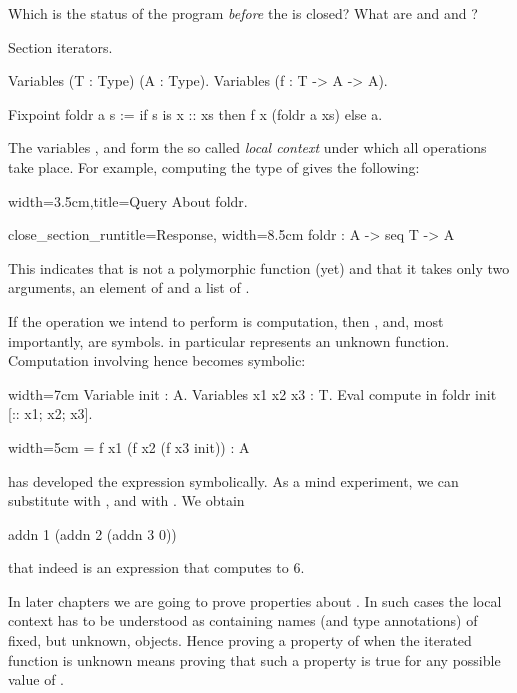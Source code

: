 Which is the status of the  program \emph{before} the
 is closed?  What are  and  and ?

\begin{coq}{}{}
Section iterators.

Variables (T : Type) (A : Type).
Variables (f : T -> A -> A).

Fixpoint foldr a s :=
  if s is x :: xs then f x (foldr a xs) else a.
\end{coq}

The variables ,  and  form the so called
\emph{local context} under which all operations take place.
For example, computing the type of  gives the following:

\begin{coq}{}{width=3.5cm,title=Query}
About foldr.
\end{coq}
\begin{coqout}{close_section_run}{title=Response, width=8.5cm}
foldr : A -> seq T -> A
\end{coqout}

This indicates that  is not a polymorphic function (yet)
and that it takes only two arguments, an element of  and
a list of .

If the operation we intend to perform is computation, then
,  and, most importantly,  are symbols.
  in particular represents an unknown function.
Computation involving  hence becomes symbolic:

\begin{coq}{}{width=7cm}
Variable init : A.
Variables x1 x2 x3 : T.
Eval compute in
  foldr init [:: x1; x2; x3].
\end{coq}
\begin{coqout}{}{width=5cm}
= f x1 (f x2 (f x3 init))
: A
\end{coqout}

\Coq{} has developed the expression symbolically.  As a mind
experiment, we can substitute  with , and
\C{[:: x1; x2; x3]} with \C{[:: 1; 2; 3]}.  We obtain
\begin{coq}{}{}
addn 1 (addn 2 (addn 3 0))
\end{coq}
that indeed is an expression that computes to 6.

In later chapters we are going to prove properties about .
In such cases the local context has to be understood as containing
names (and type annotations) of fixed, but unknown, objects.
Hence proving a property of  when the iterated function
 is unknown means proving that such a property is true for any
possible value of .

